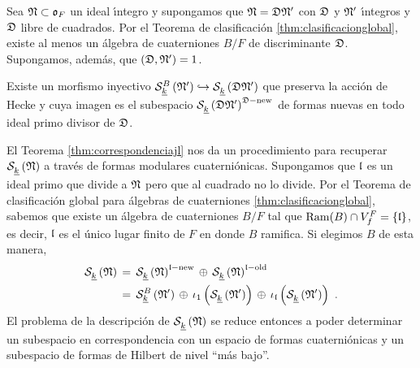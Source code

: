 Sea $\frak{N}\subset\oka{F}$ un ideal \'{\i}ntegro y supongamos que
$\frak{N}=\frak{D}\frak{N}'$ con $\frak{D}$ y $\frak{N}'$ \'{\i}ntegros y
$\frak{D}$ libre de cuadrados. Por el Teorema de clasificaci\'{o}n
\ref{thm:clasificacionglobal}, existe al menos un \'{a}lgebra de cuaterniones
$B/F$ de discriminante $\frak{D}$. Supongamos, adem\'{a}s, que
$(\frak{D},\frak{N}')=1$.

\begin{teoJacquetLanglands}\label{thm:correspondenciajl}
	Existe un morfismo inyectivo
	\begin{math}
		\spitzH[B]{k}{\frak{N}'}
			\hookrightarrow\spitzH{k}{\frak{D}\frak{N}'}
	\end{math}
	que preserva la acci\'{o}n de Hecke y cuya imagen es el subespacio
	$\spitzH{k}{\frak{D}\frak{N}'}^{\frak{D}-\neue}$ de formas
	nuevas en todo ideal primo divisor de $\frak{D}$.
\end{teoJacquetLanglands}

El Teorema \ref{thm:correspondenciajl} nos da un procedimiento para recuperar
$\spitzH{k}{\frak{N}}$ a trav\'{e}s de formas modulares cuaterni\'{o}nicas.
Supongamos que $\frak{l}$ es un ideal primo que divide a $\frak{N}$ pero que al
cuadrado no lo divide. Por el Teorema de clasificaci\'{o}n global para
\'{a}lgebras de cuaterniones \ref{thm:clasificacionglobal}, sabemos que existe
un \'{a}lgebra de cuaterniones $B/F$ tal que
$\Ram(B)\cap\lugares[f]{F}=\{\frak{l}\}$, es decir, $\frak{l}$ es el \'{u}nico
lugar finito de $F$ en donde $B$ ramifica. Si elegimos $B$ de esta manera,
\begin{align*}
	\spitzH{k}{\frak{N}} & \,=\, \spitzH{k}{\frak{N}}^{\frak{l}-\neue}
		\,\oplus\,\spitzH{k}{\frak{N}}^{\frak{l}-\oude} \\
	& \,=\, \spitzH[B]{k}{\frak{N}'}\,\oplus\,
		\iota_{1}\left(\spitzH{k}{\frak{N}'}\right)\,\oplus\,
		\iota_{\frak{l}}\left(\spitzH{k}{\frak{N}'}\right)
	\text{ .}
\end{align*}
%
El problema de la descripci\'{o}n de $\spitzH{k}{\frak{N}}$ se reduce
entonces a poder determinar un subespacio en correspondencia con un espacio
de formas cuaterni\'{o}nicas y un subespacio de formas de Hilbert de nivel
``m\'{a}s bajo''.

